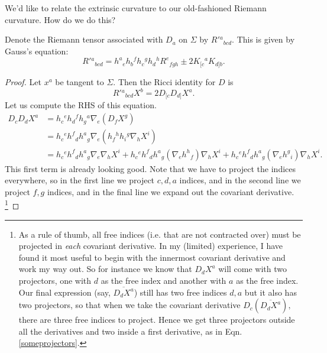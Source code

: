 We'd like to relate the extrinsic curvature to our old-fashioned Riemann curvature. How do we do this?
\begin{prop}
    Denote the Riemann tensor associated with $D_a$ on $\Sigma$ by $R'{}^a{}_{bcd}$. This is given by Gauss's equation:
    \begin{equation}
        R'{}^a{}_{bcd}=h^a{}_e h_b{}^f h_c{}^g h_d{}^h R^e{}_{fgh} \pm 2K_{[c}{}^a K_{d]b}.
    \end{equation}
\end{prop}
\begin{proof}
    Let $x^a$ be tangent to $\Sigma$. Then the Ricci identity for $D$ is
    \begin{equation}
        R'{}^a{}_{bcd} X^b = 2 D_{[c}D_{d]}X^a.
    \end{equation}
    Let us compute the RHS of this equation.
    \begin{align}
        D_c D_d X^a &= h_c{}^e h_d{}^f h_g{}^a \nabla_e(D_f X^g)\\
        &= h_c{}^e h^f{}_d h^a{}_g \nabla_e (h_f{}^h h_i{}^g \nabla_h X^i)\label{someprojectors}\\
        &=h_c{}^e h^f{}_d h^a{}_g \nabla_e \nabla_h X^i 
        + h_c{}^e h^f{}_d h^a{}_g (\nabla_e h^h{}_f) \nabla_h X^i 
        + h_c{}^e h^f{}_d h^a{}_g (\nabla_e h^g{}_i) \nabla_h X^i.\label{lotsofprojectors}
    \end{align}
    This first term is already looking good. Note that we have to project the indices everywhere, so in the first line we project $c,d,a$ indices, and in the second line we project $f,g$ indices, and in the final line we expand out the covariant derivative.%
        \footnote{As a rule of thumb, all free indices (i.e. that are not contracted over) must be projected in \emph{each} covariant derivative. In my (limited) experience, I have found it most useful to begin with the innermost covariant derivative and work my way out. So for instance we know that $D_d X^a$ will come with two projectors, one with $d$ as the free index and another with $a$ as the free index. Our final expression (say, $\overline{D_d X^a}$) still has two free indices $d,a$ but it also has two projectors, so that when we take the covariant derivative $D_c (\overline{D_d X^a}),$ there are three free indices to project. Hence we get three projectors outside all the derivatives and two inside a first derivative, as in Eqn. \ref{someprojectors}.
        }
    

\end{proof}

